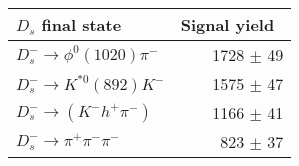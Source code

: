  \begin{tabular}{l r }
\hline\hline
$D_s$ final state  & Signal yield\ \\
\hline
$D_{s}^{-} \to \phi^{0}(1020)\pi^{-}$ & 1728 $\pm$ 49 \\
$D_{s}^{-}\to K^{*0}(892)K^{-}$ & 1575 $\pm$ 47 \\
$D_{s}^{-}\to (K^{-}h^{+}\pi^{-})$ & 1166 $\pm$ 41 \\
$D_{s}^{-}\to \pi^{+}\pi^{-}\pi^{-}$ & 823 $\pm$ 37 \\
\hline\hline
\end{tabular}
\label{table:signalYieldsDs}
